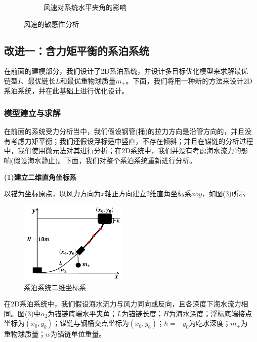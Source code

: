 \documentclass[UTF8]{ctexbook}
\theoremstyle{nonumberplain}
\begin{document}
\begin{figure}[H]
\begin{subfigure}[b]{0.4\textwidth}
                    \caption{风速对系统水平夹角的影响}
                    \label{风速对系统水平夹角的影响}
                \end{subfigure}
                \caption{风速的敏感性分析}
            \end{figure}

    \subsection{改进一：含力矩平衡的系泊系统}
        \par
        在前面的建模部分，我们设计了2D系泊系统，并设计多目标优化模型来求解最优链型$I$、最优链长$L$和最优重物球质量$m_+$。下面，我们将用一种新的方法来设计2D系泊系统，并在此基础上进行优化设计。
        \subsubsection{模型建立与求解}
            \par
            在前面的系统受力分析当中，我们假设钢管(桶)的拉力方向是沿管方向的，并且没有考虑力矩平衡；我们还假设浮标适中竖直，不存在倾斜；并且在锚链的分析过程中，我们使用微元法对其进行分析；在2D系统中，我们并没有考虑海水流力的影响(假设海水静止)。下面，我们对整个系泊系统重新进行分析。
            \par
            \textbf{(1)建立二维直角坐标系}
            \par
            以锚为坐标原点，以风力方向为$x$轴正方向建立2维直角坐标系$xoy$，如图(\ref{系泊系统二维坐标系})所示
           \begin{figure}[H]
           \centering
           \includegraphics[height=4cm]{images/xiposystem_2_axis.jpg}
           \caption{系泊系统二维坐标系}
           \label{系泊系统二维坐标系}
           \end{figure}
            在2D系泊系统中，我们假设海水流力与风力同向或反向，且各深度下海水流力相同。图(\ref{系泊系统二维坐标系})中$\alpha_2$为锚链底端水平夹角；$L$为锚链长度；$H$为海水深度；浮标底端接点坐标为$(x_0,y_0)$；锚链与钢桶交点坐标为$(x_6,y_6)$；$h = -y_0$为吃水深度；$m_+$为重物球质量；$w$为锚链单位重量。
\end{document}
